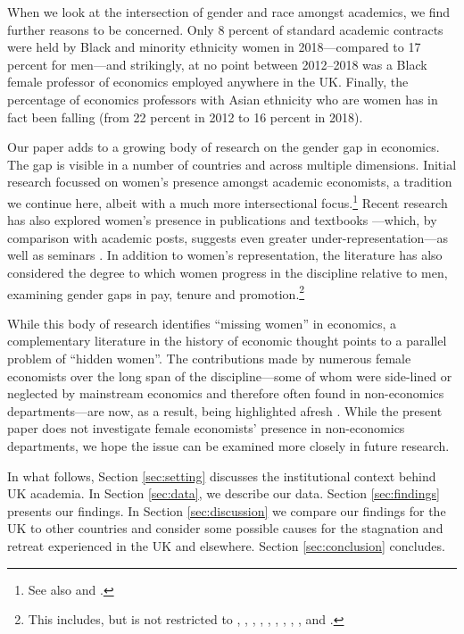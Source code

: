 \documentclass[a4paper, 1]{article}
\begin{document}
When we look at the intersection of gender and race amongst academics, we find further reasons to be concerned. Only 8 percent of standard academic contracts were held by Black and minority ethnicity women in 2018---compared to 17 percent for men---and strikingly, at no point between 2012--2018 was a Black female professor of economics employed anywhere in the UK. Finally, the percentage of economics professors with Asian ethnicity who are women has in fact been falling (from 22 percent in 2012 to 16 percent in 2018).

Our paper adds to a growing body of research on the gender gap in economics. The gap is visible in a number of countries and across multiple dimensions. Initial research focussed on women's presence amongst academic economists, a tradition we continue here, albeit with a much more intersectional focus.\footnote{See also \citet{Blackaby2000} and \citet{Advani2020}.} Recent research has also explored women's presence in publications and textbooks \citep{Moon2022, Hengel2022, Sarsons2021, Stevenson2018}---which, by comparison with academic posts, suggests even greater under-representation---as well as seminars \citep{Doleac2021}. In addition to women's representation, the literature has also considered the degree to which women progress in the discipline relative to men, examining gender gaps in pay, tenure and promotion.\footnote{This includes, but is not restricted to \citet{Auriol2022}, \citet{Blackaby2005}, \citet{Ceci2014}, \citet{Chevalier2021}, \citet{CostaDias2021}, \citet{Gamage2020}, \citet{Ginther2004}, \citet{Kahn2020}, \citet{Lundberg2019}, \citet{Mumford2019} and \citet{Ward2001}.}

While this body of research identifies ``missing women'' in economics, a complementary literature in the history of economic thought points to a parallel problem of ``hidden women''. The contributions made by numerous female economists over the long span of the discipline---some of whom were side-lined or neglected by mainstream economics and therefore often found in non-economics departments---are now, as a result, being highlighted afresh \citep[see, \emph{e.g.},][]{Folbre1988, Kuiper2022, Madden1993, Madden2018}. While the present paper does not investigate female economists' presence in non-economics departments, we hope the issue can be examined more closely in future research.

In what follows, Section \ref{sec:setting} discusses the institutional context behind UK academia. In Section \ref{sec:data}, we describe our data. Section \ref{sec:findings} presents our findings. In Section \ref{sec:discussion} we compare our findings for the UK to other countries and consider some possible causes for the stagnation and retreat experienced in the UK and elsewhere. Section \ref{sec:conclusion} concludes.
\end{document}
